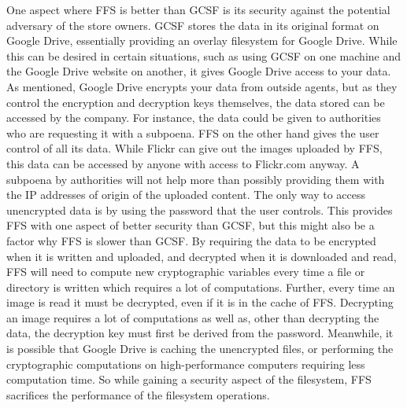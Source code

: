 One aspect where FFS is better than GCSF is its security against the potential adversary of the store owners. GCSF stores the data in its original format on Google Drive, essentially providing an overlay filesystem for Google Drive. While this can be desired in certain situations, such as using GCSF on one machine and the Google Drive website on another, it gives Google Drive access to your data. As mentioned, Google Drive encrypts your data from outside agents, but as they control the encryption and decryption keys themselves, the data stored can be accessed by the company. For instance, the data could be given to authorities who are requesting it with a subpoena. FFS on the other hand gives the user control of all its data. While Flickr can give out the images uploaded by FFS, this data can be accessed by anyone with access to Flickr.com anyway. A subpoena by authorities will not help more than possibly providing them with the IP addresses of origin of the uploaded content. The only way to access unencrypted data is by using the password that the user controls. This provides FFS with one aspect of better security than GCSF, but this might also be a factor why FFS is slower than GCSF. By requiring the data to be encrypted when it is written and uploaded, and decrypted when it is downloaded and read, FFS will need to compute new cryptographic variables every time a file or directory is written which requires a lot of computations. Further, every time an image is read it must be decrypted, even if it is in the cache of FFS. Decrypting an image requires a lot of computations as well as, other than decrypting the data, the decryption key must first be derived from the password. Meanwhile, it is possible that Google Drive is caching the unencrypted files, or performing the cryptographic computations on high-performance computers requiring less computation time. So while gaining a security aspect of the filesystem, FFS sacrifices the performance of the filesystem operations.